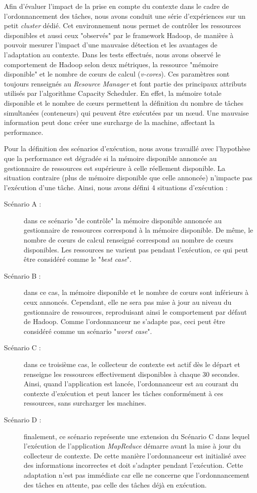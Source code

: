 Afin d'évaluer l'impact de la prise en compte du contexte dans le cadre de l'ordonnancement des tâches, nous avons conduit une série d'expériences sur un petit \textit{cluster} dédié. Cet environnement nous permet de contrôler les ressources disponibles et aussi ceux "observés" par le framework Hadoop, de manière à pouvoir mesurer l'impact d'une mauvaise détection et les avantages de l'adaptation au contexte. Dans les tests effectués, nous avons observé le comportement de Hadoop selon deux métriques, la ressource "mémoire disponible" et le nombre de c{\oe}urs de calcul (\textit{v-cores}). Ces paramètres sont toujours renseignés au \textit{Resource Manager} et font partie des principaux attributs utilisés par l'algorithme Capacity Scheduler. En effet, la mémoire totale disponible et le nombre de c{\oe}urs permettent la définition du nombre de tâches simultanées (conteneurs) qui peuvent être exécutées par un n{\oe}ud. Une mauvaise information peut donc créer une surcharge de la machine, affectant la performance.  

Pour la définition des scénarios d'exécution, nous avons travaillé avec l'hypothèse que la performance est dégradée si la mémoire disponible annoncée au gestionnaire de ressources est supérieure à celle réellement disponible. La situation contraire (plus de mémoire disponible que celle annoncée) n'impacte pas l'exécution d'une tâche. Ainsi, nous avons défini 4 situations d'exécution :

\begin{description}
	\item[Scénario A :] dans ce scénario "de contrôle" la mémoire disponible annoncée au gestionnaire de ressources correspond à la mémoire disponible. De même, le nombre de c{\oe}urs de calcul renseigné correspond au nombre de c{\oe}urs disponibles. Les ressources ne varient pas pendant l'exécution, ce qui peut être considéré comme le "\textit{best case}". 
	\item[Scénario B :] dans ce cas, la mémoire disponible et le nombre de c{\oe}urs sont inférieurs à ceux annoncés. Cependant, elle ne sera pas mise à jour au niveau du gestionnaire de ressources, reproduisant ainsi le comportement par défaut de Hadoop. Comme l'ordonnanceur ne s'adapte pas, ceci peut être considéré comme un scénario "\textit{worst case}".
	\item[Scénario C :] dans ce troisième cas, le collecteur de contexte est actif dès le départ et renseigne les ressources effectivement disponibles à chaque 30 secondes. Ainsi, quand l'application est lancée, l'ordonnanceur est au courant du contexte d'exécution et peut lancer les tâches conformément à ces ressources, sans surcharger les machines. 
	\item[Scénario D :] finalement, ce scénario représente une extension du Scénario C dans lequel l'exécution de l'application \textit{MapReduce} démarre avant la mise à jour du collecteur de contexte. De cette manière l'ordonnanceur est initialisé avec des informations incorrectes et doit s'adapter pendant l'exécution. Cette adaptation n'est pas immédiate car elle ne concerne que l'ordonnancement des tâches en attente, pas celle des tâches déjà en exécution.
\end{description}


